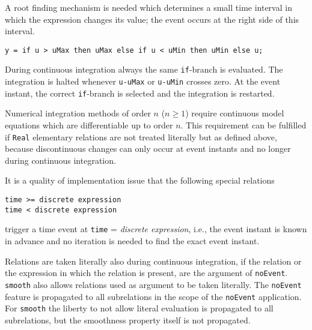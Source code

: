 \begin{nonnormative}
A root finding mechanism is needed which determines a small time interval in which the expression changes its value; the event occurs
at the right side of this interval.
\end{nonnormative}

\begin{example}
\begin{lstlisting}[language=modelica]
y = if u > uMax then uMax else if u < uMin then uMin else u;
\end{lstlisting}

During continuous integration always the same \lstinline!if!-branch is evaluated.
The integration is halted whenever \lstinline!u-uMax! or \lstinline!u-uMin! crosses zero.
At the event instant, the correct \lstinline!if!-branch is selected and the integration is restarted.

Numerical integration methods of order $n$ ($n \geq 1$) require continuous model equations which are differentiable up to order $n$.  This requirement can be fulfilled if \lstinline!Real! elementary relations are not treated literally but as defined above, because discontinuous changes can only occur at event instants and no longer during continuous integration.
\end{example}

\begin{nonnormative}
It is a quality of implementation issue that the following special relations
\begin{lstlisting}[language=modelica]
time >= discrete expression
time < discrete expression
\end{lstlisting}
trigger a time event at \lstinline!time! = \emph{discrete expression}, i.e., the
event instant is known in advance and no iteration is needed to find the
exact event instant.
\end{nonnormative}

Relations are taken literally also during continuous integration, if the relation or the expression in which the relation is present, are the argument of \lstinline!noEvent!.  \lstinline!smooth! also allows relations used as argument to be taken literally.  The \lstinline!noEvent! feature is propagated to all subrelations in the scope of the \lstinline!noEvent! application.  For \lstinline!smooth! the liberty to not allow literal evaluation is propagated to all subrelations, but the smoothness property itself is not propagated.

